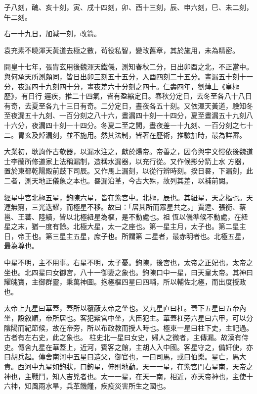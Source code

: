 \begin{pinyinscope}
 子八刻，醜、亥十刻，寅、戌十四刻，卯、酉十三刻，辰、申六刻，巳、未二刻，午二刻。



 右一十九日，加減一刻，改箭。



 袁充素不曉渾天黃道去極之數，茍役私智，變改舊章，其於施用，未為精密。



 開皇十七年，張胄玄用後魏渾天鐵儀，測知春秋二分，日出卯酉之北，不正當中。與何承天所測頗同，皆日出卯三刻五十五分，入酉四刻二十五分。晝漏五十刻十一分，夜漏四十九刻四十分，晝夜差六十分刻之四十。仁壽四年，劉焯上《皇極歷》，有日行
 遲疾，推二十四氣，皆有盈縮定日。春秋分定日，去冬至各八十八日有奇，去夏至各九十三日有奇。二分定日，晝夜各五十刻。又依渾天黃道，驗知冬至夜漏五十九刻、一百分刻之八十六，晝漏四十刻一十四分，夏至晝漏五十九刻八十六分，夜漏四十刻一十四分。冬夏二至之間，晝夜差一十九刻、一百分刻之七十二。胄玄及焯漏刻，並不施用。然其法制，皆著在歷術，推驗加時，最為詳審。



 大業初，耿詢作古欹器，以漏水注之，獻於煬帝。帝善之，因令與宇文愷依後魏道士李蘭所修道家上法稱漏制，造稱水漏器，以充行從。又作候影分箭上水
 方器，置於東都乾陽殿前鼓下司辰。又作馬上漏刻，以從行辨時刻。揆日晷，下漏刻，此二者，測天地正儀象之本也。晷漏沿革，今古大殊，故列其差，以補前闕。



 經星中宮北極五星，鉤陳六星，皆在紫宮中。北極，辰也。其紐星，天之樞也。天運無窮，三光迭耀，而極星不移。故曰：「居其所而眾星共之。」賈逵、張衡、蔡邕、王蕃、陸績，皆以北極紐星為樞，是不動處也。祖恆以儀準候不動處，在紐星之末，猶一度有餘。北極大星，太一之座也。第一星主月，太子也。第二星主日，帝王也。第三星主五星，庶子也。所謂第
 二星者，最赤明者也。北極五星，最為尊也。



 中星不明，主不用事。右星不明，太子憂。鉤陳，後宮也，太帝之正妃也，太帝之坐也。北四星曰女御宮，八十一御妻之象也。鉤陳口中一星，曰天皇太帝。其神曰耀魄寶，主御群靈，秉萬神圖。抱極樞四星曰四輔，所以輔佐北極，而出度授政也。



 太帝上九星曰華蓋，蓋所以覆蔽太帝之坐也。又九星直曰杠。蓋下五星曰五帝內坐，設敘順，帝所居也。客犯紫宮中坐，大臣犯主。華蓋杠旁六星曰六甲，可以分陰陽而紀節候，故在帝旁，所以布政教而授人時也。極東一星曰柱下史，主記過。古者有左右史，此之象也。
 柱史北一星曰女史，婦人之微者，主傳漏。故漢有侍史。傳舍九星在華蓋上，近河，賓客之館，主胡人入中國。客星守之，備奸使，亦曰胡兵起。傳舍南河中五星曰造父，御官也，一曰司馬，或曰伯樂。星亡，馬大貴。西河中九星如鉤狀，曰鉤星，伸則地動。天一一星，在紫宮門右星南，天帝之神也，主戰鬥，知人吉兇者也。太一一星，在天一南，相近，亦天帝神也，主使十六神，知風雨水旱，兵革饑饉，疾疫災害所生之國也。




\end{pinyinscope}
